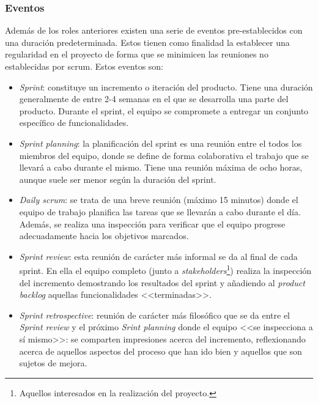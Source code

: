 \subsubsection{Eventos}
Además de los roles anteriores existen una serie de eventos pre-establecidos con una duración predeterminada. Estos tienen como finalidad la establecer una regularidad en el proyecto de forma que se minimicen las reuniones no establecidas por scrum. Estos eventos son:
\begin{itemize}
    \item \textit{Sprint}: constituye un incremento o iteración del producto. Tiene una duración generalmente de entre 2-4 semanas en el que se desarrolla una parte del producto. Durante el sprint, el equipo se compromete a entregar un conjunto específico de funcionalidades.
    \item \textit{Sprint planning}: la planificación del sprint es una reunión entre el todos los miembros del equipo, donde se define de forma colaborativa el trabajo que se llevará a cabo durante el mismo. Tiene una reunión máxima de ocho horas, aunque suele ser menor según la duración del sprint.
    \item \textit{Daily scrum}: se trata de una breve reunión (máximo 15 minutos) donde el equipo de trabajo planifica las tareas que se llevarán a cabo durante el día. Además, se realiza una inspección para verificar que el equipo progrese adecuadamente hacia los objetivos marcados.
    \item \textit{Sprint review}: esta reunión de carácter más informal se da al final de cada sprint. En ella el equipo completo (junto a \textit{stakeholders}\footnote{Aquellos interesados en la realización del proyecto.}) realiza la inspección del incremento demostrando los resultados del sprint y añadiendo al \textit{product backlog} aquellas funcionalidades <<terminadas>>.
    \item \textit{Sprint retrospective}: reunión de carácter más filosófico que se da entre el \textit{Sprint review} y el próximo \textit{Srint planning} donde el equipo <<se inspecciona a sí mismo>>: se comparten impresiones acerca del incremento, reflexionando acerca de aquellos aspectos del proceso que han ido bien y aquellos que son sujetos de mejora.

\end{itemize}
